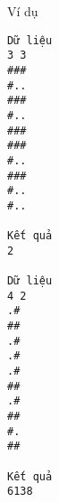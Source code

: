 Ví dụ
\begin{verbatim}
Dữ liệu
3 3
###
#..
###
#..
###
###
#..
###
#..
#..	

Kết quả
2

Dữ liệu
4 2
.#
##
.#
.#
.#
##
.#
##
#.
##	

Kết quả
6138
\end{verbatim}